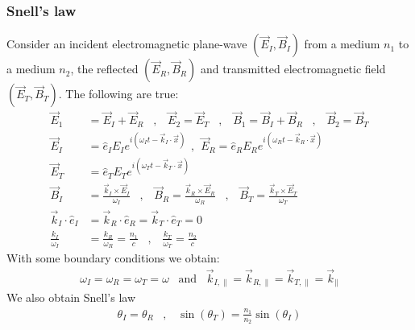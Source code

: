 \subsubsection{Snell's law}

Consider an incident electromagnetic plane-wave $(\vec{E}_I,\vec{B}_I)$ from
a medium $n_1$ to a medium $n_2$, the reflected $(\vec{E}_R,\vec{B}_R)$ and transmitted
electromagnetic field $(\vec{E}_T,\vec{B}_T)$. The following are true:
\begin{align*}
    \vec{E}_1 &= \vec{E}_I + \vec{E}_R
    \hspace{10pt} , \hspace{10pt}
    \vec{E}_2 = \vec{E}_T
    \hspace{10pt} , \hspace{10pt}
    \vec{B}_1 = \vec{B}_I + \vec{B}_R
    \hspace{10pt} , \hspace{10pt}
    \vec{B}_2 = \vec{B}_T
    \\
    \vec{E}_I &= \hat{e}_I E_I e^{i(\omega_I t - \vec{k}_I \cdot \vec{x})}
    \hspace{5pt} , \hspace{5pt}
    \vec{E}_R = \hat{e}_R E_R e^{i(\omega_R t - \vec{k}_R \cdot \vec{x})}
    \\
    \vec{E}_T &= \hat{e}_T E_T e^{i(\omega_T t - \vec{k}_T \cdot \vec{x})}
    \\
    \vec{B}_I &= \frac{\vec{k}_I \times \vec{E}_I}{\omega_I}
    \hspace{10pt} , \hspace{10pt}
    \vec{B}_R = \frac{\vec{k}_R \times \vec{E}_R}{\omega_R}
    \hspace{10pt} , \hspace{10pt}
    \vec{B}_T = \frac{\vec{k}_T \times \vec{E}_T}{\omega_T}
    \\
    \vec{k}_I \cdot \hat{e}_I &= \vec{k}_R \cdot \hat{e}_R
    = \vec{k}_T \cdot \hat{e}_T = 0
    \\
    \frac{k_I}{\omega_I} &= \frac{k_R}{\omega_R} = \frac{n_1}{c}
    \hspace{10pt} , \hspace{10pt}
    \frac{k_T}{\omega_T} = \frac{n_2}{c}
\end{align*}
With some boundary conditions we obtain:
\begin{align*}
    \omega_I = \omega_R = \omega_T = \omega
    \hspace{10pt} \text{and} \hspace{10pt}
    \vec{k}_{I,\parallel} = \vec{k}_{R,\parallel} = \vec{k}_{T,\parallel}
    = \vec{k}_{\parallel}
\end{align*}
We also obtain Snell's law
\begin{align*}
    \theta_I = \theta_R
    \hspace{10pt} , \hspace{10pt}
    \sin(\theta_T) = \frac{n_1}{n_2} \sin(\theta_I)
\end{align*}


